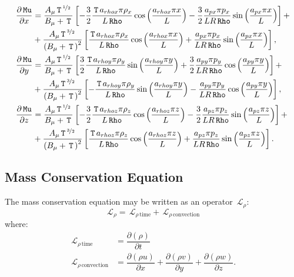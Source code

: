 \documentclass[10pt]{article}
\newcommand{\Diff}[2] {\dfrac{\partial( #1)}{\partial #2}}
\newcommand{\diff}[2] {\dfrac{\partial #1}{\partial #2}}
\newcommand{\Rho}{\,\mathtt{Rho}}
\newcommand{\Lo}{\,\mathcal{L}}
\newcommand{\Mu}{\,\mathtt{Mu}}
\newcommand{\T}{\,\mathtt{T}\,}
\newcommand{\DMuDx}{\diff{\Mu}{x}}
\newcommand{\DMuDy}{\diff{\Mu}{y}}
\newcommand{\DMuDz}{\diff{\Mu}{z}}
\begin{document}
\begin{equation}\label{eq:aux_02}
 \begin{split}
\DMuDx&=
\frac{A_{\mu} \T^{\nicefrac{1}{2} \, } }{B_{\mu} + \T}\left[-  \frac{3}{2} \frac{    \T a_{rhox} \pi \rho_{x} }{L \Rho}\cos\left(\frac{a_{rhox} \pi x}{L}\right) -  \frac{3}{2} \frac{   a_{px} \pi  p_{x} }{L R \Rho}\sin\left(\frac{a_{px} \pi  x}{L}\right)\right] +\\
& + \frac{A_{\mu} \T^{\nicefrac{3}{2} \, } }{\left(B_{\mu} + \T\right)^{2}}\left[\frac{ \T a_{rhox} \pi \rho_{x} }{L \Rho}\cos\left(\frac{a_{rhox} \pi x}{L}\right) + \frac{a_{px} \pi  p_{x} }{L R \Rho}\sin\left(\frac{a_{px} \pi  x}{L}\right)\right],\\
%
 \DMuDy&=
\frac{A_{\mu} \T^{\nicefrac{1}{2} \, } }{B_{\mu} + \T}\left[ \frac{3}{2} \frac{    \T a_{rhoy} \pi \rho_{y} }{L \Rho}\sin\left(\frac{a_{rhoy} \pi y}{L}\right) +  \frac{3}{2} \frac{   a_{py} \pi  p_{y}}{L R \Rho} \cos\left(\frac{a_{py} \pi  y}{L}\right)\right] +\\
& + \frac{A_{\mu} \T^{\nicefrac{3}{2} \, } }{\left(B_{\mu} + \T\right)^{2}}\left[- \frac{ \T a_{rhoy} \pi \rho_{y} }{L \Rho}\sin\left(\frac{a_{rhoy} \pi y}{L}\right) - \frac{a_{py} \pi  p_{y} }{L R \Rho}\cos\left(\frac{a_{py} \pi  y}{L}\right)\right],\\
%
 \DMuDz&=
\frac{A_{\mu} \T^{\nicefrac{1}{2} \, } }{B_{\mu} + \T}\left[-  \frac{3}{2} \frac{    \T a_{rhoz} \pi \rho_{z} }{L \Rho}\cos\left(\frac{a_{rhoz} \pi z}{L}\right) -  \frac{3}{2} \frac{   a_{pz} \pi  p_{z}}{L R \Rho} \sin\left(\frac{a_{pz} \pi  z}{L}\right)\right] +\\
& + \frac{A_{\mu} \T^{\nicefrac{3}{2} \, } }{\left(B_{\mu} + \T\right)^{2}}\left[\frac{ \T a_{rhoz} \pi \rho_{z} }{L \Rho}\cos\left(\frac{a_{rhoz} \pi z}{L}\right) + \frac{a_{pz} \pi  p_{z} }{L R \Rho}\sin\left(\frac{a_{pz} \pi  z}{L}\right)\right].
 \end{split}
\end{equation}


\subsection{Mass Conservation Equation}

The mass conservation equation may be written as an operator $\Lo_\rho$:
$$ \Lo_{\rho} = \Lo_{\rho \, \text{time}}+\Lo_{\rho \, \text{convection}}$$
where:
\begin{equation}
\begin{split}\label{eq:rho_operators}
\Lo_{\rho \, \text{time}}&=\Diff{\rho}{t} \\
\Lo_{\rho \, \text{convection}}&=\Diff{\rho u}{x}+\Diff{\rho v}{y} + \Diff{\rho w}{z}.
\end{split}
 \end{equation}
\end{document}
